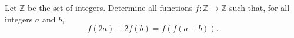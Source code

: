 Let $\mathbb Z$ be the set of integers. Determine all functions $f:\mathbb Z\to\mathbb Z$ such that, for all integers $a$ and $b$,
\[f(2a)+2f(b)=f\left(f(a+b)\right).\]
